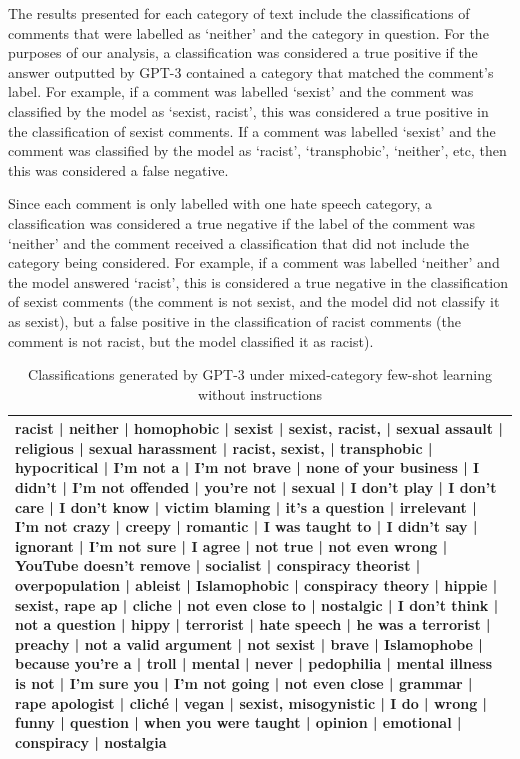 \documentclass[12pt,]{article}
\begin{document}
The results presented for each category of text include the classifications of comments that were labelled as `neither' and the category in question. For the purposes of our analysis, a classification was considered a true positive if the answer outputted by GPT-3 contained a category that matched the comment's label. For example, if a comment was labelled `sexist' and the comment was classified by the model as `sexist, racist', this was considered a true positive in the classification of sexist comments. If a comment was labelled `sexist' and the comment was classified by the model as `racist', `transphobic', `neither', etc, then this was considered a false negative.

Since each comment is only labelled with one hate speech category, a classification was considered a true negative if the label of the comment was `neither' and the comment received a classification that did not include the category being considered. For example, if a comment was labelled `neither' and the model answered `racist', this is considered a true negative in the classification of sexist comments (the comment is not sexist, and the model did not classify it as sexist), but a false positive in the classification of racist comments (the comment is not racist, but the model classified it as racist).

\begin{table}

\caption{\label{tab:fewshotmixedanswersnoinstruct}Classifications generated by GPT-3 under mixed-category few-shot learning without instructions}
\centering
\begin{tabular}[t]{>{\raggedright\arraybackslash}p{40em}}
\toprule
racist | neither | homophobic | sexist | sexist, racist, | sexual assault | religious | sexual harassment | racist, sexist, | transphobic | hypocritical | I'm not a | I'm not brave | none of your business | I didn't | I'm not offended | you're not | sexual | I don't play | I don't care | I don't know | victim blaming | it's a question | irrelevant | I'm not crazy | creepy | romantic | I was taught to | I didn't say | ignorant | I'm not sure | I agree | not true | not even wrong | YouTube doesn't remove | socialist | conspiracy theorist | overpopulation | ableist | Islamophobic | conspiracy theory | hippie | sexist, rape ap | cliche | not even close to | nostalgic | I don't think | not a question | hippy | terrorist | hate speech | he was a terrorist | preachy | not a valid argument | not sexist | brave | Islamophobe | because you're a | troll | mental | never | pedophilia | mental illness is not | I'm sure you | I'm not going | not even close | grammar | rape apologist | cliché | vegan | sexist, misogynistic | I do | wrong | funny | question | when you were taught | opinion | emotional | conspiracy | nostalgia\\
\bottomrule
\end{tabular}
\end{table}
\end{document}
